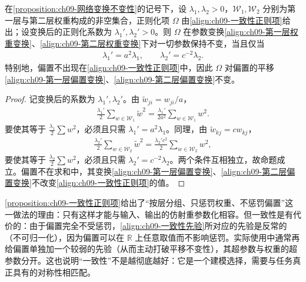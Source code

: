 \documentclass[../../main.tex]{subfiles}
\begin{document}
\begin{proposition}[一致性正则项]\label{proposition:ch09-一致性正则项}
在\cref{proposition:ch09-网络变换不变性}的记号下，设 $\lambda_{1},\lambda_{2}>0$，$\mathcal{W}_{1},\mathcal{W}_{2}$ 分别为第一层与第二层权重构成的非空集合，正则化项 $\Omega$ 由\eqref{align:ch09-一致性正则项}给出；设变换后的正则化系数为 $\lambda_{1}',\lambda_{2}'>0$。则 $\Omega$ 在参数变换\eqref{align:ch09-第一层权重变换}、\eqref{align:ch09-第二层权重变换}下对一切参数保持不变，当且仅当
\begin{align*}
\lambda_{1}'=a^{2}\lambda_{1},\qquad \lambda_{2}'=c^{-2}\lambda_{2}.
\end{align*}
特别地，偏置不出现在\eqref{align:ch09-一致性正则项}中，因此 $\Omega$ 对偏置的平移\eqref{align:ch09-第一层偏置变换}、\eqref{align:ch09-第二层偏置变换}不变。
\end{proposition}

\begin{proof}
记变换后的系数为 $\lambda_{1}',\lambda_{2}'$。由 $\tilde{w}_{ji}=w_{ji}/a$，
\begin{align*}
\frac{\lambda_{1}'}{2}\sum_{w\in\mathcal{W}_{1}}\tilde{w}^{2}=\frac{\lambda_{1}'}{2a^{2}}\sum_{w\in\mathcal{W}_{1}}w^{2}.
\end{align*}
要使其等于 $\frac{\lambda_{1}}{2}\sum w^{2}$，必须且只需 $\lambda_{1}'=a^{2}\lambda_{1}$。同理，由 $\tilde{w}_{kj}=cw_{kj}$，
\begin{align*}
\frac{\lambda_{2}'}{2}\sum_{w\in\mathcal{W}_{2}}\tilde{w}^{2}=\frac{\lambda_{2}'c^{2}}{2}\sum_{w\in\mathcal{W}_{2}}w^{2},
\end{align*}
要使其等于 $\frac{\lambda_{2}}{2}\sum w^{2}$，必须且只需 $\lambda_{2}'=c^{-2}\lambda_{2}$。两个条件互相独立，故命题成立。偏置不在求和中，其变换\eqref{align:ch09-第一层偏置变换}、\eqref{align:ch09-第二层偏置变换}不改变\eqref{align:ch09-一致性正则项}的值。
\end{proof}

\begin{remark}\cref{proposition:ch09-一致性正则项}给出了“按层分组、只惩罚权重、不惩罚偏置”这一做法的理由：只有这样才能与输入、输出的仿射重参数化相容。但一致性是有代价的：由于偏置完全不受惩罚，\eqref{align:ch09-一致性先验}所对应的先验是反常的（不可归一化），因为偏置可以在 $\mathbb{R}$ 上任意取值而不影响惩罚。实际使用中通常再给偏置单独加一个较弱的先验（从而主动打破平移不变性），其超参数与权重的超参数分开。这也说明“一致性”不是越彻底越好：它是一个建模选择，需要与任务真正具有的对称性相匹配。
\end{remark}
\end{document}
